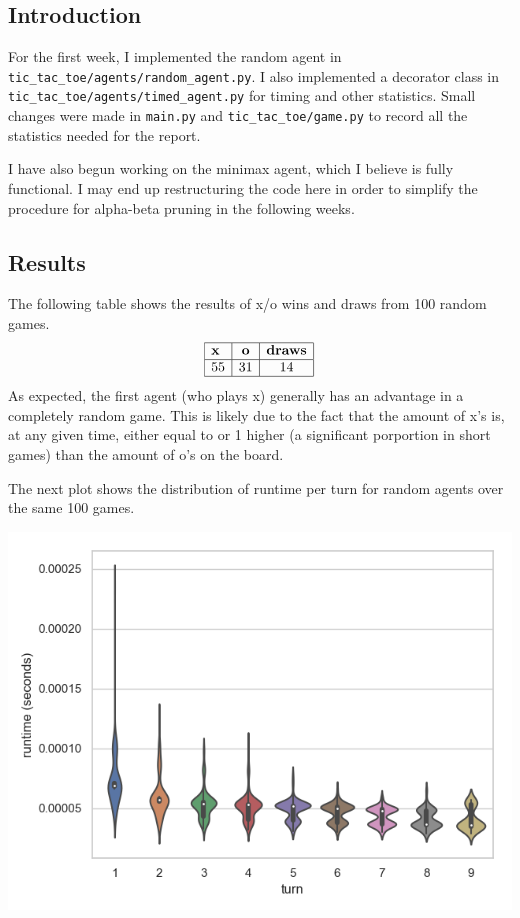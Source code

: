 \documentclass[12pt]{article}
\begin{document}
\subsection*{Introduction}
For the first week, I implemented the random agent in \texttt{tic\_tac\_toe/agents/random\_agent.py}. I also implemented a decorator class in \texttt{tic\_tac\_toe/agents/timed\_agent.py} for timing and other statistics. Small changes were made in \texttt{main.py} and \texttt{tic\_tac\_toe/game.py} to record all the statistics needed for the report.

I have also begun working on the minimax agent, which I believe is fully functional. I may end up restructuring the code here in order to simplify the procedure for alpha-beta pruning in the following weeks.

\subsection*{Results}
The following table shows the results of x/o wins and draws from 100 random games.
\[
    \begin{array}{|l|c|c|}
        \hline
        \textbf{x} & \textbf{o} & \textbf{draws}\\
        \hline
        55 & 31 & 14\\
        \hline
    \end{array}    
\]
As expected, the first agent (who plays x) generally has an advantage in a completely random game. This is likely due to the fact that the amount of x's is, at any given time, either equal to or 1 higher (a significant porportion in short games) than the amount of o's on the board.

The next plot shows the distribution of runtime per turn for random agents over the same 100 games.

\hspace*{.3in}
\includegraphics[scale=.7]{../../plots/random_random/runtime.png}
\end{document}
